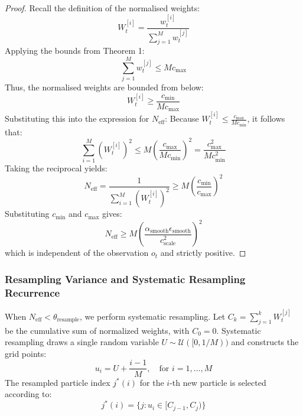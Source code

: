 \documentclass[11pt,a4paper]{report}
\begin{document}
\begin{proof}
Recall the definition of the normalised weights:
\begin{equation}
    W_t^{[i]} = \frac{w_t^{[i]}}{\sum_{j=1}^M w_t^{[j]}}
\end{equation}
Applying the bounds from Theorem 1:
\begin{equation}
    \sum_{j=1}^M w_t^{[j]} \le M c_{\text{max}}
\end{equation}
Thus, the normalised weights are bounded from below:
\begin{equation}
    W_t^{[i]} \ge \frac{c_{\text{min}}}{M c_{\text{max}}}
\end{equation}
Substituting this into the expression for $N_{\text{eff}}$:
Because $W_t^{[i]} \le \frac{c_{\text{max}}}{M c_{\text{min}}}$, it follows that:
\begin{equation}
    \sum_{i=1}^M (W_t^{[i]})^2 \le M \left( \frac{c_{\text{max}}}{M c_{\text{min}}} \right)^2 = \frac{c_{\text{max}}^2}{M c_{\text{min}}^2}
\end{equation}
Taking the reciprocal yields:
\begin{equation}
    N_{\text{eff}} = \frac{1}{\sum_{i=1}^M (W_t^{[i]})^2} \ge M \left( \frac{c_{\text{min}}}{c_{\text{max}}} \right)^2
\end{equation}
Substituting $c_{\text{min}}$ and $c_{\text{max}}$ gives:
\begin{equation}
    N_{\text{eff}} \ge M \left( \frac{\alpha_{\text{smooth}} \epsilon_{\text{smooth}}}{c_{\text{scale}}^2} \right)^2
\end{equation}
which is independent of the observation $o_t$ and strictly positive.
\end{proof}

\subsubsection{Resampling Variance and Systematic Resampling Recurrence}
When $N_{\text{eff}} < \theta_{\text{resample}}$, we perform systematic resampling. Let $C_k = \sum_{j=1}^k W_t^{[j]}$ be the cumulative sum of normalized weights, with $C_0 = 0$. Systematic resampling draws a single random variable $U \sim \mathcal{U}([0, 1/M))$ and constructs the grid points:
\begin{equation}
    u_i = U + \frac{i-1}{M}, \quad \text{for } i = 1, \dots, M
\end{equation}
The resampled particle index $j^*(i)$ for the $i$-th new particle is selected according to:
\begin{equation}
    j^*(i) = \{ j : u_i \in [C_{j-1}, C_j) \}
\end{equation}
\end{document}
